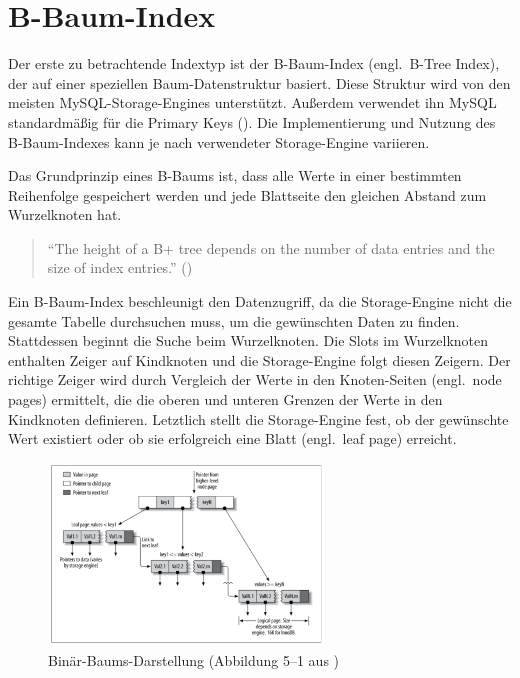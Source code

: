 \section{B-Baum-Index}\label{sec:indexing-b-baum-index}

Der erste zu betrachtende Indextyp ist der B-Baum-Index (engl.\ B-Tree Index), der auf einer speziellen Baum-Datenstruktur basiert.
Diese Struktur wird von den meisten MySQL-Storage-Engines unterstützt.
Außerdem verwendet ihn MySQL standardmäßig für die Primary Keys (\cite{mysql_primary_key}).
Die Implementierung und Nutzung des B-Baum-Indexes kann je nach verwendeter Storage-Engine variieren.

Das Grundprinzip eines B-Baums ist, dass alle Werte in einer bestimmten Reihenfolge gespeichert werden und jede Blattseite den gleichen Abstand zum Wurzelknoten hat.

\begin{quote}
    \enquote{The height of a B+ tree depends on the number of data entries and the size of index entries.} (\cite[S. 358]{ramakrishnan2002database})
\end{quote}

Ein B-Baum-Index beschleunigt den Datenzugriff, da die Storage-Engine nicht die gesamte Tabelle durchsuchen muss, um die gewünschten Daten zu finden.
Stattdessen beginnt die Suche beim Wurzelknoten.
Die Slots im Wurzelknoten enthalten Zeiger auf Kindknoten und die Storage-Engine folgt diesen Zeigern.
Der richtige Zeiger wird durch Vergleich der Werte in den Knoten-Seiten (engl.\ node pages) ermittelt, die die oberen und unteren Grenzen der Werte in den Kindknoten definieren.
Letztlich stellt die Storage-Engine fest, ob der gewünschte Wert existiert oder ob sie erfolgreich eine Blatt (engl.\ leaf page) erreicht.

\vspace{-8pt}
\begin{figure}[H]
    \centering
    \includegraphics[width=0.65\textwidth]{PNGs/Textbook/B_Tree_Visualisation}
    \caption[Binärbaum-Visualisierung]{Binär-Baums-Darstellung (Abbildung 5--1 aus \cite[S. 149]{schwartz2012high})}
    \label{fig:b-tree-visualisation}
\end{figure}
\vspace{-20pt}

